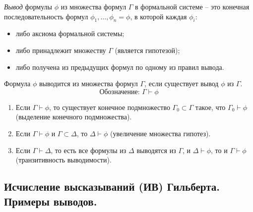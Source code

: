 \begin{definition}[Вывод]
    \emph{Вывод} формулы $\phi$ из множества формул $\Gamma$ в формальной системе -- это конечная последовательность формул $\phi_1,\ldots,\phi_n = \phi$, в которой каждая $\phi_i$:
    \begin{itemize}
        \item либо аксиома формальной системы;
        \item либо принадлежит множеству $\Gamma$ (является гипотезой);
        \item либо получена из предыдущих формул по одному из правил вывода.
    \end{itemize}
\end{definition}

\begin{definition}[Выводимость]
    Формула $\phi$ выводится из множества формул $\Gamma$, если существует вывод $\phi$ из $\Gamma$.
    \[
        \text{Обозначение: }\Gamma\vdash\phi
    \]
\end{definition}

\begin{statement}\leavevmode
    \begin{enumerate}
        \item Если $\Gamma\vdash\phi$, то существует конечное подмножество $\Gamma_0 \subset \Gamma$ такое, что $\Gamma_0 \vdash\phi$ (выделение конечного подмножества).
        \item Если $\Gamma\vdash\phi$ и $\Gamma\subset\Delta$, то $\Delta\vdash\phi$ (увеличение множества гипотез).
        \item Если $\Gamma\vdash\Delta$, то есть все формулы из $\Delta$ выводятся из $\Gamma$, и $\Delta\vdash\phi$, то и $\Gamma\vdash\phi$ (транзитивность выводимости).
    \end{enumerate}
\end{statement}

\subsection{Исчисление высказываний (ИВ) Гильберта. Примеры выводов.}

